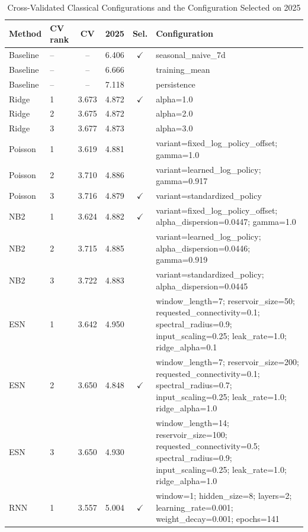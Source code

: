 \documentclass[journal]{IEEEtran}
\begin{document}
\begin{table}[t]
\centering
\caption{Cross-Validated Classical Configurations and the Configuration Selected on 2025}
\label{tab:classcfg}
\footnotesize
\setlength{\tabcolsep}{3pt}
\begin{tabular}{@{}llcccp{11.4cm}@{}}
\toprule
Method & CV rank & CV & 2025 & Sel. & Configuration \\ \midrule
Baseline & -- & -- & 6.406 & $\checkmark$ & seasonal\_naive\_7d \\
Baseline & -- & -- & 6.666 &  & training\_mean \\
Baseline & -- & -- & 7.118 &  & persistence \\
Ridge & 1 & 3.673 & 4.872 & $\checkmark$ & alpha=1.0 \\
Ridge & 2 & 3.675 & 4.872 &  & alpha=2.0 \\
Ridge & 3 & 3.677 & 4.873 &  & alpha=3.0 \\
Poisson & 1 & 3.619 & 4.881 &  & variant=fixed\_log\_policy\_offset; gamma=1.0 \\
Poisson & 2 & 3.710 & 4.886 &  & variant=learned\_log\_policy; gamma=0.917 \\
Poisson & 3 & 3.716 & 4.879 & $\checkmark$ & variant=standardized\_policy \\
NB2 & 1 & 3.624 & 4.882 & $\checkmark$ & variant=fixed\_log\_policy\_offset; alpha\_dispersion=0.0447; gamma=1.0 \\
NB2 & 2 & 3.715 & 4.885 &  & variant=learned\_log\_policy; alpha\_dispersion=0.0446; gamma=0.919 \\
NB2 & 3 & 3.722 & 4.883 &  & variant=standardized\_policy; alpha\_dispersion=0.0445 \\
ESN & 1 & 3.642 & 4.950 &  & window\_length=7; reservoir\_size=50; requested\_connectivity=0.1; spectral\_radius=0.9; input\_scaling=0.25; leak\_rate=1.0; ridge\_alpha=0.1 \\
ESN & 2 & 3.650 & 4.848 & $\checkmark$ & window\_length=7; reservoir\_size=200; requested\_connectivity=0.1; spectral\_radius=0.7; input\_scaling=0.25; leak\_rate=1.0; ridge\_alpha=1.0 \\
ESN & 3 & 3.650 & 4.930 &  & window\_length=14; reservoir\_size=100; requested\_connectivity=0.5; spectral\_radius=0.9; input\_scaling=0.25; leak\_rate=1.0; ridge\_alpha=1.0 \\
RNN & 1 & 3.557 & 5.004 & $\checkmark$ & window=1; hidden\_size=8; layers=2; learning\_rate=0.001; weight\_decay=0.001; epochs=141 \\

\end{tabular}
\end{table}
\end{document}
